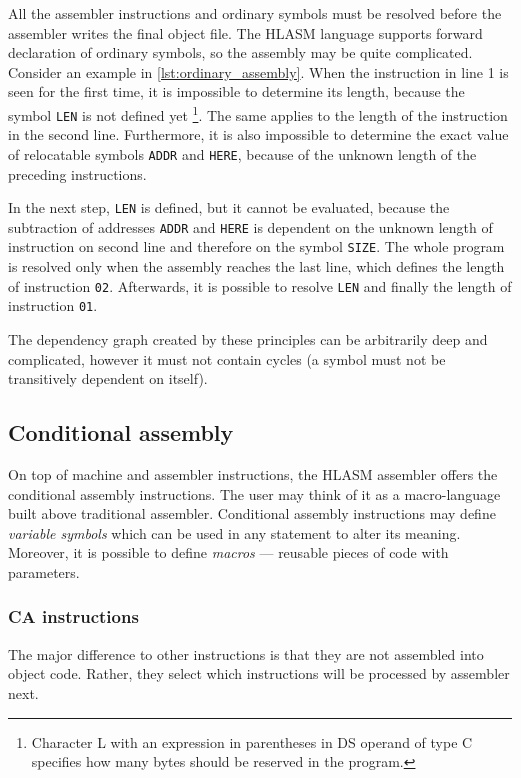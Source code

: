 All the assembler instructions and ordinary symbols must be resolved before the assembler writes the final object file. The HLASM language supports forward declaration of ordinary symbols, so the assembly may be quite complicated. Consider an example in \cref{lst:ordinary_assembly}. When the instruction in line 1 is seen for the first time, it is impossible to determine its length, because the symbol \verb|LEN| is not defined yet \footnote{Character L with an expression in parentheses in DS operand of type C specifies how many bytes should be reserved in the program.}. The same applies to the length of the instruction in the second line. Furthermore, it is also impossible to determine the exact value of relocatable symbols \verb|ADDR| and \verb|HERE|, because of the unknown length of the preceding instructions.

In the next step, \verb|LEN| is defined, but it cannot be evaluated, because the subtraction of addresses \verb|ADDR| and \verb|HERE| is dependent on the unknown length of instruction on second line and therefore on the symbol \verb|SIZE|. The whole program is resolved only when the assembly reaches the last line, which defines the length of instruction \verb|02|. Afterwards, it is possible to resolve \verb|LEN| and finally the length of instruction \verb|01|.

The dependency graph created by these principles can be arbitrarily deep and complicated, however it must not contain cycles (a symbol must not be transitively dependent on itself).



\subsection{Conditional assembly}
\label{CA_proc}

On top of machine and assembler instructions, the HLASM assembler offers the conditional assembly instructions. The user may think of it as a macro-language built above traditional assembler. Conditional assembly instructions may define \emph{variable symbols} which can be used in any statement to alter its meaning. Moreover, it is possible to define \emph{macros} --- reusable pieces of code with parameters.

\subsubsection{CA instructions}

The major difference to other instructions is that they are not assembled into object code. Rather, they select which instructions will be processed by assembler next.

